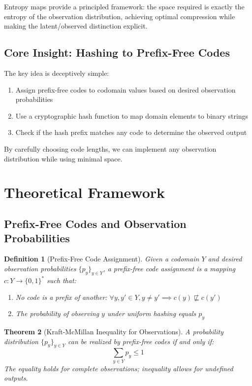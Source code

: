 \documentclass[11pt,final,hidelinks]{article}
\newtheorem{theorem}{Theorem}[section]
\newtheorem{definition}[theorem]{Definition}
\begin{document}
Entropy maps provide a principled framework: the space required is exactly the entropy of the observation distribution, achieving optimal compression while making the latent/observed distinction explicit.

\subsection{Core Insight: Hashing to Prefix-Free Codes}

The key idea is deceptively simple:
\begin{enumerate}
    \item Assign prefix-free codes to codomain values based on desired observation probabilities
    \item Use a cryptographic hash function to map domain elements to binary strings
    \item Check if the hash prefix matches any code to determine the observed output
\end{enumerate}

By carefully choosing code lengths, we can implement any observation distribution while using minimal space.

\section{Theoretical Framework}

\subsection{Prefix-Free Codes and Observation Probabilities}

\begin{definition}[Prefix-Free Code Assignment]
Given a codomain $Y$ and desired observation probabilities $\{p_y\}_{y \in Y}$, a prefix-free code assignment is a mapping $c: Y \to \{0,1\}^*$ such that:
\begin{enumerate}
    \item No code is a prefix of another: $\forall y, y' \in Y, y \neq y' \implies c(y) \not\sqsubseteq c(y')$
    \item The probability of observing $y$ under uniform hashing equals $p_y$
\end{enumerate}
\end{definition}

\begin{theorem}[Kraft-McMillan Inequality for Observations]
A probability distribution $\{p_y\}_{y \in Y}$ can be realized by prefix-free codes if and only if:
\begin{equation}
\sum_{y \in Y} p_y \leq 1
\end{equation}
The equality holds for complete observations; inequality allows for undefined outputs.
\end{theorem}
\end{document}
